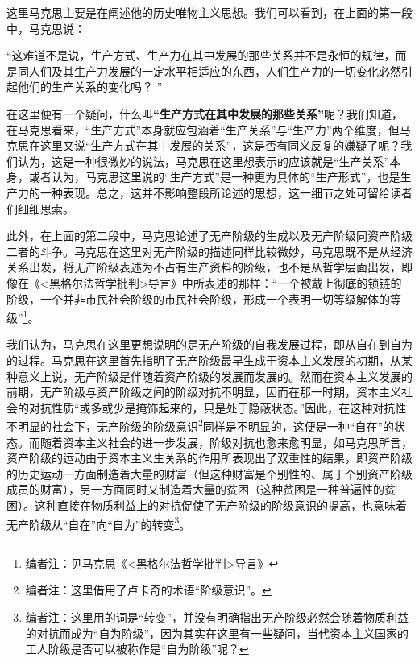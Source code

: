 \documentclass[a4paper,twoside,12pt,AutoFakeBold]{ctexart}
\begin{document}
这里马克思主要是在阐述他的历史唯物主义思想。我们可以看到，在上面的第一段中，马克思说：
\begin{adjustwidth}{2em}{2em}
    \qquad\fangsong
    “这难道不是说，生产方式、生产力在其中发展的那些关系并不是永恒的规律，而是同人们及其生产力发展的一定水平相适应的东西，人们生产力的一切变化必然引起他们的生产关系的变化吗？ ”
\end{adjustwidth}

在这里便有一个疑问，什么叫\textbf{“生产方式在其中发展的那些关系”}呢？我们知道，在马克思看来，“生产方式”本身就应包涵着“生产关系”与“生产力”两个维度，但马克思在这里又说“生产方式在其中发展的关系”，这是否有同义反复的嫌疑了呢？我们认为，这是一种很微妙的说法，马克思在这里想表示的应该就是“生产关系”本身，或者认为，马克思这里说的“生产方式”是一种更为具体的“生产形式”，也是生产力的一种表现。总之，这并不影响整段所论述的思想，这一细节之处可留给读者们细细思索。

此外，在上面的第二段中，马克思论述了无产阶级的生成以及无产阶级同资产阶级二者的斗争。马克思在这里对无产阶级的描述同样比较微妙，马克思既不是从经济关系出发，将无产阶级表述为不占有生产资料的阶级，也不是从哲学层面出发，即像在《<黑格尔法哲学批判>导言》中所表述的那样：“一个被戴上彻底的锁链的阶级，一个并非市民社会阶级的市民社会阶级，形成一个表明一切等级解体的等级”\footnote{编者注：见马克思《<黑格尔法哲学批判>导言》}。

我们认为，马克思在这里更想说明的是无产阶级的自我发展过程，即从自在到自为的过程。马克思在这里首先指明了无产阶级最早生成于资本主义发展的初期，从某种意义上说，无产阶级是伴随着资产阶级的发展而发展的。然而在资本主义发展的前期，无产阶级与资产阶级之间的阶级对抗不明显，因而在那一时期，资本主义社会的对抗性质“或多或少是掩饰起来的，只是处于隐蔽状态。”因此，在这种对抗性不明显的社会下，无产阶级的阶级意识\footnote{编者注：这里借用了卢卡奇的术语“阶级意识”。}同样是不明显的，这便是一种“自在”的状态。而随着资本主义社会的进一步发展，阶级对抗也愈来愈明显，如马克思所言，资产阶级的运动由于资本主义生关系的作用所表现出了双重性的结果，即资产阶级的历史运动一方面制造着大量的财富（但这种财富是个别性的、属于个别资产阶级成员的财富），另一方面同时又制造着大量的贫困（这种贫困是一种普遍性的贫困）。这种直接在物质利益上的对抗促使了无产阶级的阶级意识的提高，也意味着无产阶级从“自在”向“自为”的转变\footnote{编者注：这里用的词是“转变”，并没有明确指出无产阶级必然会随着物质利益的对抗而成为“自为阶级”，因为其实在这里有一些疑问，当代资本主义国家的工人阶级是否可以被称作是“自为阶级”呢？}。
\end{document}
